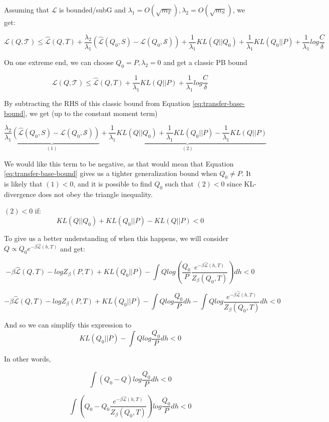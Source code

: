 \documentclass[letterpaper]{article}
\theoremstyle{definition}
\begin{document}
Assuming that $\mathcal{L}$ is bounded/subG and $\lambda_1=O(\sqrt{m_T}), \lambda_2=O(\sqrt{m_S})$, we get:

\begin{equation} \label{eq:transfer-base-bound}
\mathcal{L}(Q, \mathcal{T}) \leq \hat{\mathcal{L}}(Q,T) +\frac{\lambda_2}{\lambda_1} \left (\hat{\mathcal{L}}(Q_0,S)-\mathcal{L}(Q_0,\mathcal{S}) \right ) + \frac{1}{\lambda_1}KL(Q||Q_0)+\frac{1}{\lambda_1}KL(Q_0||P)+ \frac{1}{\lambda_1}log\frac{C}{\delta}
\end{equation}

On one extreme end, we can choose $Q_0=P, \lambda_2=0$ and get a classic PB bound

$$ \mathcal{L}(Q, \mathcal{T}) \leq \hat{\mathcal{L}}(Q,T) +\frac{1}{\lambda_1}KL(Q||P)+ \frac{1}{\lambda_1}log\frac{C}{\delta}$$

By subtracting the RHS of this classic bound from Equation \ref{eq:transfer-base-bound}, we get (up to the constant moment term)

$$\underbrace{\frac{\lambda_2}{\lambda_1} \left (\hat{\mathcal{L}}(Q_0,S)-\mathcal{L}(Q_0,\mathcal{S}) \right )}_{(1)} + \underbrace{\frac{1}{\lambda_1}KL(Q||Q_0)+\frac{1}{\lambda_1}KL(Q_0||P)-\frac{1}{\lambda_1}KL(Q||P)}_{(2)}$$

We would like this term to be negative, as that would mean that Equation \ref{eq:transfer-base-bound} gives us a tighter generalization bound when $Q_0\neq P$. It is likely that $(1)<0$, and it is possible to find $Q_0$ such that $(2)<0$ since KL-divergence does not obey the triangle inequality.

$(2)<0$ if:
$$ KL(Q||Q_0)+KL(Q_0||P)-KL(Q||P) < 0$$

To give us a better understanding of when this happens, we will consider $Q\propto Q_0 e^{-\beta \hat{\mathcal{L}}(h,T)}$ and get:

$$ -\beta \hat{\mathcal{L}}(Q,T)-logZ_{\beta}(P,T)+KL(Q_0||P)-\int Qlog\left (\frac{Q_0}{P}\frac{e^{-\beta \hat{\mathcal{L}}(h,T)}}{Z_\beta(Q_0,T)}\right )dh<0$$

$$ -\beta \hat{\mathcal{L}}(Q,T)-logZ_{\beta}(P,T)+KL(Q_0||P)-\int Qlog\frac{Q_0}{P}dh-\int Qlog\frac{e^{-\beta \hat{\mathcal{L}}(h,T)}}{Z_\beta(Q_0,T)}dh<0$$

And so we can simplify this expression to
$$ KL(Q_0||P)-\int Qlog\frac{Q_0}{P}dh<0$$

In other words, 

$$\int (Q_0-Q)log\frac{Q_0}{P}dh<0$$

$$\int \left (Q_0-Q_0\frac{e^{-\beta\hat{\mathcal{L}}(h,T)}}{Z_{\beta}(Q_0,T)}\right )log\frac{Q_0}{P}dh<0$$
\end{document}
